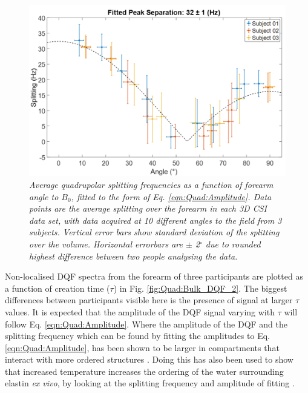 \begin{figure}
    \centering
    \includegraphics[width=1\textwidth]{Figures/Quad/Split_Angle_2.png}
    \caption{\textit{Average quadrupolar splitting frequencies as a function of forearm angle to $B_0$, fitted to the form of Eq. \ref{eqn:Quad:Amplitude}. Data points are the average splitting over the forearm in each 3D \ac{CSI} data set, with data acquired at 10 different angles to the field from 3 subjects. Vertical error bars show standard deviation of the splitting over the volume. Horizontal errorbars are $\pm$ 2$^\circ$ due to rounded highest difference between two people analysing the data.}}
    \label{fig:Quad:Split_Angle_2}
\end{figure}

Non-localised \ac{DQF} spectra from the forearm of three participants are plotted as a function of creation time ($\tau$) in Fig. \ref{fig:Quad:Bulk_DQF_2}. The biggest differences between participants visible here is the presence of signal at larger $\tau$ values. It is expected that the amplitude of the \ac{DQF} signal varying with $\tau$ will follow  Eq. \ref{eqn:Quad:Amplitude}. Where the amplitude of the \ac{DQF} and the splitting frequency which can be found by fitting the amplitudes to Eq. \ref{eqn:Quad:Amplitude}, has been shown to be larger in compartments that interact with more ordered structures \cite{Navon2001MultiquantumTissues}. Doing this has also been used to show that increased temperature increases the ordering of the water surrounding elastin \textit{ex vivo}, by looking at the splitting frequency and amplitude of fitting \cite{Sun2010InvestigationNMR}.

